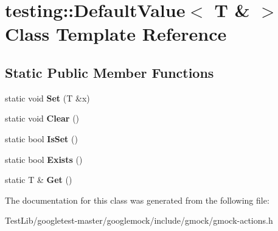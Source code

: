 \hypertarget{classtesting_1_1DefaultValue_3_01T_01_6_01_4}{}\section{testing\+:\+:Default\+Value$<$ T \& $>$ Class Template Reference}
\label{classtesting_1_1DefaultValue_3_01T_01_6_01_4}
\subsection*{Static Public Member Functions}
\begin{DoxyCompactItemize}
\item 
\mbox{\label{classtesting_1_1DefaultValue_3_01T_01_6_01_4_a9863abf3d311ce5007d7e57dfce2f252}} 
static void {\bfseries Set} (T \&x)
\item 
\mbox{\label{classtesting_1_1DefaultValue_3_01T_01_6_01_4_a3c8f9f81e591370f9b33798f58ca1a10}} 
static void {\bfseries Clear} ()
\item 
\mbox{\label{classtesting_1_1DefaultValue_3_01T_01_6_01_4_a3e61547c2f0141cc8004385f3a9c817d}} 
static bool {\bfseries Is\+Set} ()
\item 
\mbox{\label{classtesting_1_1DefaultValue_3_01T_01_6_01_4_a38420499e17d2fb4146ae6c4265f0d55}} 
static bool {\bfseries Exists} ()
\item 
\mbox{\label{classtesting_1_1DefaultValue_3_01T_01_6_01_4_a1310448dd8c171aecfcbf7c8df5de7bd}} 
static T \& {\bfseries Get} ()
\end{DoxyCompactItemize}


The documentation for this class was generated from the following file\+:\begin{DoxyCompactItemize}
\item 
Test\+Lib/googletest-\/master/googlemock/include/gmock/gmock-\/actions.\+h\end{DoxyCompactItemize}

